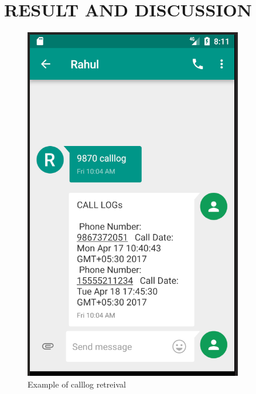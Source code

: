

\chapter{RESULT AND DISCUSSION}

\hspace{0.9cm} \begin{figure}[h!]
	\centering	
	\includegraphics[scale=0.7]{examplecalllog.png} %
	\caption{Example of calllog retreival}
	\label{fig:9} %
	
	
\end{figure}

